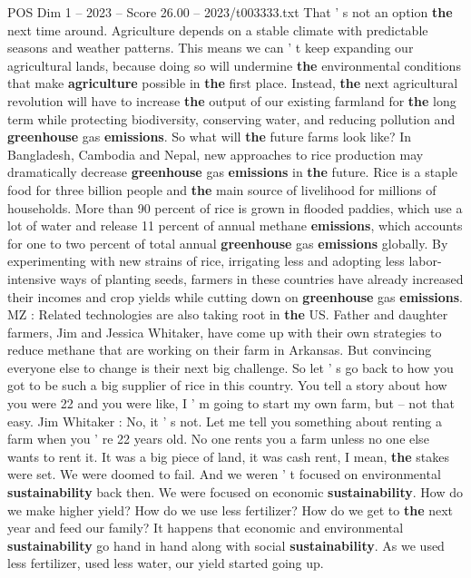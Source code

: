 \begin{textsample}{POS Dim 1 – 2023 – Score 26.00 – 2023/t003333.txt}
That ' s not an option \textbf{the} next time around.
Agriculture depends on a stable climate with predictable seasons and weather patterns.
This means we can ' t keep expanding our agricultural lands, because doing so will undermine \textbf{the} environmental conditions that make \textbf{agriculture} possible in \textbf{the} first place.
Instead, \textbf{the} next agricultural revolution will have to increase \textbf{the} output of our existing farmland for \textbf{the} long term while protecting biodiversity, conserving water, and reducing pollution and \textbf{greenhouse} gas \textbf{emissions}.
So what will \textbf{the} future farms look like?
In Bangladesh, Cambodia and Nepal, new approaches to rice production may dramatically decrease \textbf{greenhouse} gas \textbf{emissions} in \textbf{the} future.
Rice is a staple food for three billion people and \textbf{the} main source of livelihood for millions of households.
More than 90 percent of rice is grown in flooded paddies, which use a lot of water and release 11 percent of annual methane \textbf{emissions}, which accounts for one to two percent of total annual \textbf{greenhouse} gas \textbf{emissions} globally.
By experimenting with new strains of rice, irrigating less and adopting less labor-intensive ways of planting seeds, farmers in these countries have already increased their incomes and crop yields while cutting down on \textbf{greenhouse} gas \textbf{emissions}.
MZ : Related technologies are also taking root in \textbf{the} US.
Father and daughter farmers, Jim and Jessica Whitaker, have come up with their own strategies to reduce methane that are working on their farm in Arkansas.
But convincing everyone else to change is their next big challenge.
So let ' s go back to how you got to be such a big supplier of rice in this country.
You tell a story about how you were 22 and you were like, I ' m going to start my own farm, but -- not that easy.
Jim Whitaker : No, it ' s not.
Let me tell you something about renting a farm when you ' re 22 years old.
No one rents you a farm unless no one else wants to rent it.
It was a big piece of land, it was cash rent, I mean, \textbf{the} stakes were set.
We were doomed to fail.
And we weren ' t focused on environmental \textbf{sustainability} back then.
We were focused on economic \textbf{sustainability}.
How do we make higher yield?
How do we use less fertilizer?
How do we get to \textbf{the} next year and feed our family?
It happens that economic and environmental \textbf{sustainability} go hand in hand along with social \textbf{sustainability}.
As we used less fertilizer, used less water, our yield started going up.

\end{textsample}

